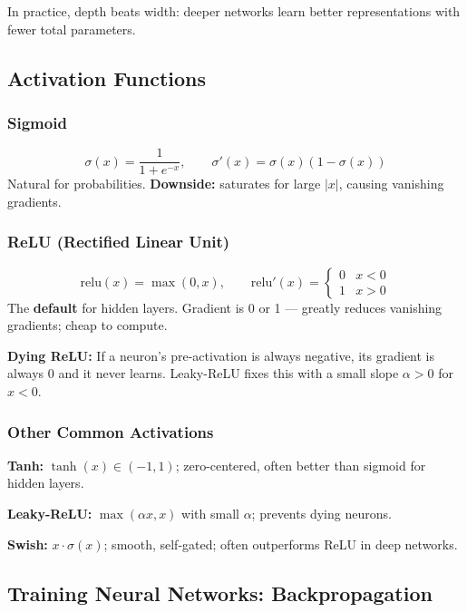 \documentclass[11pt]{article}
\begin{document}
In practice, depth beats width: deeper networks learn better representations with fewer total parameters.

\subsection{Activation Functions}

\subsubsection{Sigmoid}
\[
\sigma(x) = \frac{1}{1+e^{-x}}, \qquad \sigma'(x) = \sigma(x)(1-\sigma(x))
\]
Natural for probabilities. \textbf{Downside:} saturates for large $|x|$, causing vanishing gradients.

\subsubsection{ReLU (Rectified Linear Unit)}
\[
\text{relu}(x) = \max(0,x), \qquad \text{relu}'(x) = \begin{cases}0 & x < 0 \\ 1 & x > 0\end{cases}
\]
The \textbf{default} for hidden layers. Gradient is 0 or 1 --- greatly reduces vanishing gradients; cheap to compute.

\begin{notebox}
\textbf{Dying ReLU:} If a neuron's pre-activation is always negative, its gradient is always 0 and it never learns. Leaky-ReLU fixes this with a small slope $\alpha > 0$ for $x < 0$.
\end{notebox}

\subsubsection{Other Common Activations}

\textbf{Tanh:} $\tanh(x) \in (-1,1)$; zero-centered, often better than sigmoid for hidden layers.

\textbf{Leaky-ReLU:} $\max(\alpha x, x)$ with small $\alpha$; prevents dying neurons.

\textbf{Swish:} $x \cdot \sigma(x)$; smooth, self-gated; often outperforms ReLU in deep networks.

\subsection{Training Neural Networks: Backpropagation}
\end{document}
